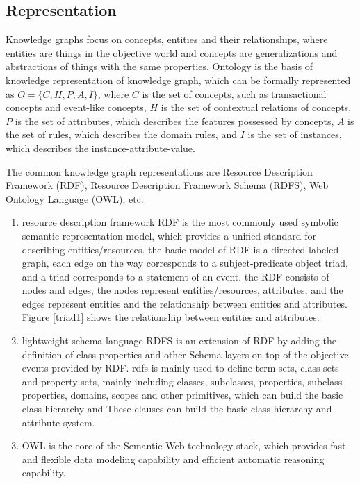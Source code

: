 \subsection{Representation}
Knowledge graphs focus on concepts, entities and their relationships, where entities are things in the objective world and concepts are generalizations and abstractions of things with the same properties. Ontology is the basis of knowledge representation of knowledge graph, which can be formally represented as $O=\{C,H,P,A,I\}$, where $C$ is the set of concepts, such as transactional concepts and event-like concepts, $H$ is the set of contextual relations of concepts, $P$ is the set of attributes, which describes the features possessed by concepts, $A$ is the set of rules, which describes the domain rules, and $I$ is the set of instances, which describes the instance-attribute-value.

The common knowledge graph representations are Resource Description Framework (RDF), Resource Description Framework Schema (RDFS), Web Ontology Language (OWL), etc.

\begin{enumerate}
\item resource description framework RDF is the most commonly used symbolic semantic representation model, which provides a unified standard for describing entities/resources. the basic model of RDF is a directed labeled graph, each edge on the way corresponds to a subject-predicate object triad, and a triad corresponds to a statement of an event. the RDF consists of nodes and edges, the nodes represent entities/resources, attributes, and the edges represent entities and the relationship between entities and attributes. Figure \ref{triad1} shows the relationship between entities and attributes.
\item lightweight schema language RDFS is an extension of RDF by adding the definition of class properties and other Schema layers on top of the objective events provided by RDF. rdfs is mainly used to define term sets, class sets and property sets, mainly including classes, subclasses, properties, subclass properties, domains, scopes and other primitives, which can build the basic class hierarchy and These clauses can build the basic class hierarchy and attribute system.
\item OWL is the core of the Semantic Web technology stack, which provides fast and flexible data modeling capability and efficient automatic reasoning capability.
\end{enumerate}

